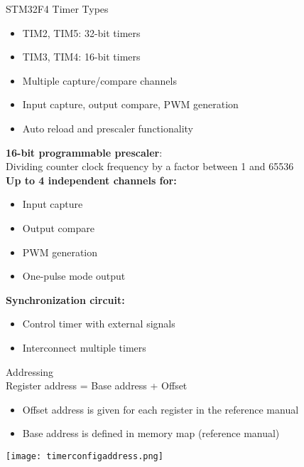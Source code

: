 \begin{concept}{STM32F4 Timer Types}
    \begin{itemize}
        \item TIM2, TIM5: 32-bit timers
        \item TIM3, TIM4: 16-bit timers
        \item Multiple capture/compare channels
        \item Input capture, output compare, PWM generation
        \item Auto reload and prescaler functionality
    \end{itemize}
\textbf{16-bit programmable prescaler}: \\
Dividing counter clock frequency by a factor between 1 and 65536\\
\textbf{Up to 4 independent channels for:}

\begin{minipage}{0.4\linewidth}
\begin{itemize}
    \item Input capture
    \item Output compare
\end{itemize}
\end{minipage}
\begin{minipage}{0.6\linewidth}
\begin{itemize}
    \item PWM generation
    \item One-pulse mode output
\end{itemize}
\end{minipage}

\textbf{Synchronization circuit:}
\begin{itemize}
    \item Control timer with external signals
    \item Interconnect multiple timers
\end{itemize}
\end{concept}

\begin{theorem}{Addressing} \\
    Register address = Base address + Offset
    \begin{itemize}
        \item Offset address is given for each register in the reference manual
        \item Base address is defined in memory map (reference manual)
    \end{itemize}
    \texttt{[image: timerconfigaddress.png]}
\end{theorem}

